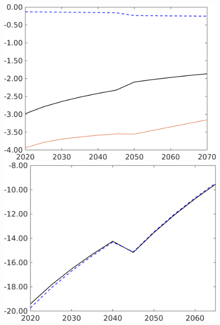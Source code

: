 \begin{figure}[h!!]
\begin{minipage}[]{0.32\textwidth}
	\end{minipage}
	\begin{minipage}[]{0.32\textwidth}
		\includegraphics[width=1\textwidth]{../../codding_model/own_basedOnFried/optimalPol_190722_tidiedUp/figures/all_10Aout22/hl_PercentageLfDynNT_Target_regime3_spillover0_noskill0_sep1_xgrowth0_etaa0.79_lgd0.png}
	\end{minipage}
	\begin{minipage}[]{0.32\textwidth}
	\includegraphics[width=1\textwidth]{../../codding_model/own_basedOnFried/optimalPol_190722_tidiedUp/figures/all_10Aout22/gAagg_PercentageLfDynNT_noeff_Target_regime3_spillover0_noskill0_sep1_xgrowth0_etaa0.79_lgd0.png}

\end{minipage}
\end{figure}
